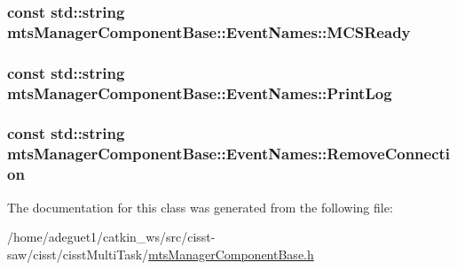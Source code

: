 \hypertarget{classmts_manager_component_base_1_1_event_names_a355cdd3ebdf92a00a01aca1ded79604f}{
\subsubsection[{M\-C\-S\-Ready}]{\setlength{\rightskip}{0pt plus 5cm}const std\-::string mts\-Manager\-Component\-Base\-::\-Event\-Names\-::\-M\-C\-S\-Ready\hspace{0.3cm}{\ttfamily [static]}}}\label{classmts_manager_component_base_1_1_event_names_a355cdd3ebdf92a00a01aca1ded79604f}
\hypertarget{classmts_manager_component_base_1_1_event_names_aba75227480c71f9c9f841514b8799534}{
\subsubsection[{Print\-Log}]{\setlength{\rightskip}{0pt plus 5cm}const std\-::string mts\-Manager\-Component\-Base\-::\-Event\-Names\-::\-Print\-Log\hspace{0.3cm}{\ttfamily [static]}}}\label{classmts_manager_component_base_1_1_event_names_aba75227480c71f9c9f841514b8799534}
\hypertarget{classmts_manager_component_base_1_1_event_names_a6ed5a8983b5fcaf54f4325330c05d42e}{
\subsubsection[{Remove\-Connection}]{\setlength{\rightskip}{0pt plus 5cm}const std\-::string mts\-Manager\-Component\-Base\-::\-Event\-Names\-::\-Remove\-Connection\hspace{0.3cm}{\ttfamily [static]}}}\label{classmts_manager_component_base_1_1_event_names_a6ed5a8983b5fcaf54f4325330c05d42e}


The documentation for this class was generated from the following file\-:\begin{DoxyCompactItemize}
\item 
/home/adeguet1/catkin\-\_\-ws/src/cisst-\/saw/cisst/cisst\-Multi\-Task/\hyperlink{mts_manager_component_base_8h}{mts\-Manager\-Component\-Base.\-h}\end{DoxyCompactItemize}
